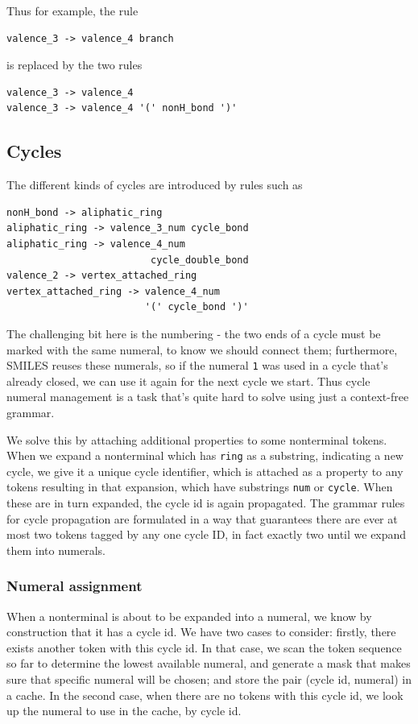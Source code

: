 \documentclass{article}
\begin{document}
Thus for example, the rule
{\footnotesize 
\begin{verbatim}
valence_3 -> valence_4 branch
\end{verbatim}} is replaced by the two rules
{\footnotesize 
	\begin{verbatim}
valence_3 -> valence_4
valence_3 -> valence_4 '(' nonH_bond ')'
\end{verbatim}}
\subsection{Cycles}
The different kinds of cycles are introduced by rules such as 
{\footnotesize \begin{verbatim}
nonH_bond -> aliphatic_ring
aliphatic_ring -> valence_3_num cycle_bond
aliphatic_ring -> valence_4_num 
                         cycle_double_bond
valence_2 -> vertex_attached_ring
vertex_attached_ring -> valence_4_num 
                        '(' cycle_bond ')'
\end{verbatim}}
The challenging bit here is the numbering - the two ends of a cycle must be marked with the same numeral, to know we should connect them; furthermore, SMILES reuses these numerals, so if the numeral \verb|1| was used in a cycle that's already closed, we can use it again for the next cycle we start. Thus cycle numeral management is a task that's quite hard to solve using just a context-free grammar.

We solve this by attaching additional properties to some nonterminal tokens. When we expand a nonterminal which has \verb|ring| as a substring, indicating a new cycle, we give it a unique cycle identifier, which is attached as a property to any tokens resulting in that expansion, which have substrings \verb|num| or \verb|cycle|. When these are in turn expanded, the cycle id is again propagated. The grammar rules for cycle propagation are formulated in a way that guarantees there are ever at most two tokens tagged by any one cycle ID, in fact exactly two until we expand them into numerals.
\subsubsection{Numeral assignment}
When a nonterminal is about to be expanded into a numeral, we know by construction that it has a cycle id. We have two cases to consider: firstly, there exists another token with this cycle id. In that case, we scan the token sequence so far to determine the lowest available numeral, and generate a mask that makes sure that specific numeral will be chosen; and store the pair (cycle id, numeral) in a cache. In the second case, when there are no tokens with this cycle id, we look up the numeral to use in the cache, by cycle id.
\end{document}

